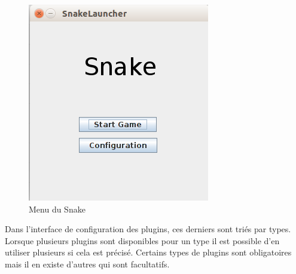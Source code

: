 \documentclass[12pt,a4paper]{article}
\begin{document}
\begin{figure}[h]
    \centering
    \includegraphics[scale=0.5]{ressources/menu.png}
    \caption{Menu du Snake}
\end{figure}    

\newpage
Dans l'interface de configuration des plugins, ces derniers sont triés par types. 
Lorsque plusieurs plugins sont disponibles pour un type il est possible d'en 
utiliser plusieurs si cela est précisé. Certains types de plugins sont obligatoires
mais il en existe d'autres qui sont facultatifs.
\end{document}
